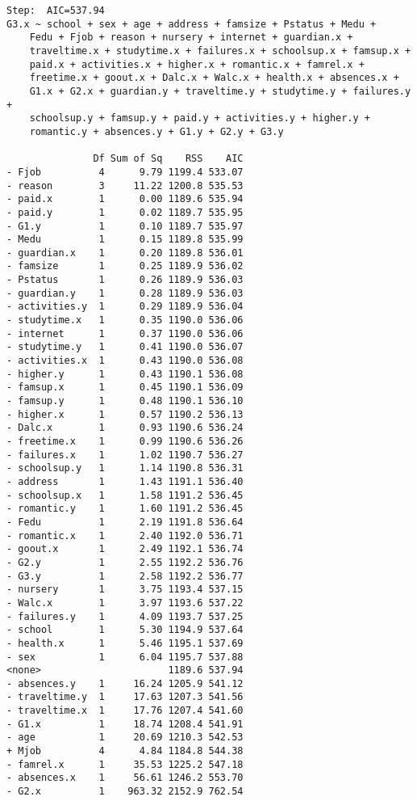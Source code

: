 \documentclass[11pt]{article}
\begin{document}
\begin{enumerate}
\begin{verbatim}
Step:  AIC=537.94
G3.x ~ school + sex + age + address + famsize + Pstatus + Medu + 
    Fedu + Fjob + reason + nursery + internet + guardian.x + 
    traveltime.x + studytime.x + failures.x + schoolsup.x + famsup.x + 
    paid.x + activities.x + higher.x + romantic.x + famrel.x + 
    freetime.x + goout.x + Dalc.x + Walc.x + health.x + absences.x + 
    G1.x + G2.x + guardian.y + traveltime.y + studytime.y + failures.y + 
    schoolsup.y + famsup.y + paid.y + activities.y + higher.y + 
    romantic.y + absences.y + G1.y + G2.y + G3.y

               Df Sum of Sq    RSS    AIC
- Fjob          4      9.79 1199.4 533.07
- reason        3     11.22 1200.8 535.53
- paid.x        1      0.00 1189.6 535.94
- paid.y        1      0.02 1189.7 535.95
- G1.y          1      0.10 1189.7 535.97
- Medu          1      0.15 1189.8 535.99
- guardian.x    1      0.20 1189.8 536.01
- famsize       1      0.25 1189.9 536.02
- Pstatus       1      0.26 1189.9 536.03
- guardian.y    1      0.28 1189.9 536.03
- activities.y  1      0.29 1189.9 536.04
- studytime.x   1      0.35 1190.0 536.06
- internet      1      0.37 1190.0 536.06
- studytime.y   1      0.41 1190.0 536.07
- activities.x  1      0.43 1190.0 536.08
- higher.y      1      0.43 1190.1 536.08
- famsup.x      1      0.45 1190.1 536.09
- famsup.y      1      0.48 1190.1 536.10
- higher.x      1      0.57 1190.2 536.13
- Dalc.x        1      0.93 1190.6 536.24
- freetime.x    1      0.99 1190.6 536.26
- failures.x    1      1.02 1190.7 536.27
- schoolsup.y   1      1.14 1190.8 536.31
- address       1      1.43 1191.1 536.40
- schoolsup.x   1      1.58 1191.2 536.45
- romantic.y    1      1.60 1191.2 536.45
- Fedu          1      2.19 1191.8 536.64
- romantic.x    1      2.40 1192.0 536.71
- goout.x       1      2.49 1192.1 536.74
- G2.y          1      2.55 1192.2 536.76
- G3.y          1      2.58 1192.2 536.77
- nursery       1      3.75 1193.4 537.15
- Walc.x        1      3.97 1193.6 537.22
- failures.y    1      4.09 1193.7 537.25
- school        1      5.30 1194.9 537.64
- health.x      1      5.46 1195.1 537.69
- sex           1      6.04 1195.7 537.88
<none>                      1189.6 537.94
- absences.y    1     16.24 1205.9 541.12
- traveltime.y  1     17.63 1207.3 541.56
- traveltime.x  1     17.76 1207.4 541.60
- G1.x          1     18.74 1208.4 541.91
- age           1     20.69 1210.3 542.53
+ Mjob          4      4.84 1184.8 544.38
- famrel.x      1     35.53 1225.2 547.18
- absences.x    1     56.61 1246.2 553.70
- G2.x          1    963.32 2152.9 762.54


\end{verbatim}
\end{enumerate}
\end{document}
